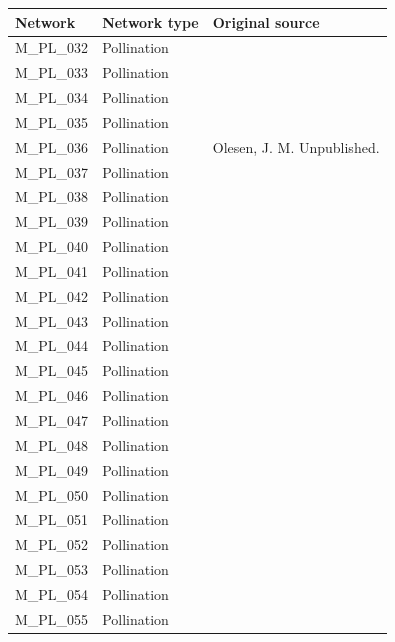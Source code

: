 \documentclass[12pt]{article}
\begin{document}
\begin{spacing}{1.0}
    \begin{table}[h!]
    \begin{center}
    \begin{tabular}{|l l m{6cm} |}
    \hline
    Network & Network type & Original source \\
    \hline
    M\_PL\_032  & Pollination & \citep{Schemske1978}  \\
    M\_PL\_033  & Pollination & \citep{Small1976} \\
    M\_PL\_034  & Pollination & \citep{SmithRamirez2005}  \\
    M\_PL\_035  & Pollination & \citep{Percival1974}  \\
    M\_PL\_036  & Pollination & Olesen, J. M. Unpublished.  \\
    M\_PL\_037  & Pollination & \citep{Montero2005} \\
    M\_PL\_038  & Pollination & \citep{Montero2005} \\
    M\_PL\_039  & Pollination & \citep{Stald2003} \\
    M\_PL\_040  & Pollination & \citep{Ingversen2006} \\
    M\_PL\_041  & Pollination & \citep{Ingversen2006} \\
    M\_PL\_042  & Pollination & \citep{Philipp2006} \\
    M\_PL\_043  & Pollination & \citep{Montero2005} \\
    M\_PL\_044  & Pollination & \citep{Kato2000}  \\
    M\_PL\_045  & Pollination & \citep{Lundgren2005}  \\
    M\_PL\_046  & Pollination & \citep{Bundgaard2003} \\
    M\_PL\_047  & Pollination & \citep{Dupont2009a}  \\
    M\_PL\_048  & Pollination & \citep{Dupont2009a}  \\
    M\_PL\_049  & Pollination & \citep{Beks2006}  \\
    M\_PL\_050  & Pollination & \citep{Stald2003} \\
    M\_PL\_051  & Pollination & \citep{Vazquez2002} \\
    M\_PL\_052  & Pollination & \citep{Witt1998}  \\
    M\_PL\_053  & Pollination & \citep{Yamazaki2003}  \\
    M\_PL\_054  & Pollination & \citep{Kakutani1990}  \\
    M\_PL\_055  & Pollination & \citep{Kato1996}  \\

\end{tabular}
\end{center}
\end{table}
\end{spacing}
\end{document}
